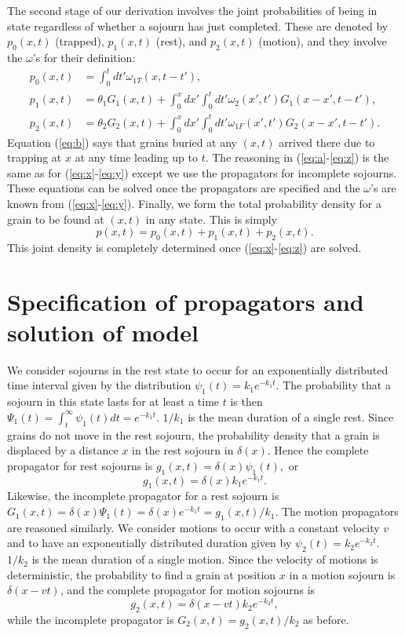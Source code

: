 \documentclass[]{agujournal2018}
\newcommand\be{\begin{equation}}
\newcommand\ee{\end{equation}}
\begin{document}
The second stage of our derivation involves the joint probabilities of being in state regardless of whether a sojourn has just completed. These are denoted by  $p_0(x,t)$ (trapped), $p_1(x,t)$ (rest), and $p_2(x,t)$ (motion), and they involve the $\omega$'s for their definition:
\begin{align}
p_0(x,t) &= \int_0^t dt' \omega_{1T}(x,t-t'), \label{eq:b}\\
p_1(x,t) &= \theta_1 G_1(x,t) + \int_0^x dx' \int_0^t dt' \omega_2(x',t')G_1(x-x',t-t'),\label{eq:a}\\
p_2(x,t) &= \theta_2 G_2(x,t) + \int_0^x dx' \int_0^t dt'  \omega_{1F}(x',t')G_2(x-x',t-t').\label{eq:z}
\end{align}
Equation (\ref{eq:b}) says that grains buried at any $(x,t)$ arrived there due to trapping at $x$ at any time leading up to $t$.
The reasoning in (\ref{eq:a}-\ref{eq:z}) is the same as for (\ref{eq:x}-\ref{eq:y}) except we use the propagators for incomplete sojourns.
These equations can be solved once the propagators are specified and the $\omega$'s are known from (\ref{eq:x}-\ref{eq:y}).
Finally, we form the total probability density for a grain to be found at $(x,t)$ in any state.
This is simply 
\be p(x,t) = p_0(x,t) + p_1(x,t) + p_2(x,t). \label{eq:dist}\ee
This joint density is completely determined once (\ref{eq:x}-\ref{eq:z}) are solved.


\section{Specification of propagators and solution of model}
\label{sec:solution}
We consider sojourns in the rest state to occur for an exponentially distributed time interval given by the distribution $\psi_1(t) = k_1 e^{-k_1t}.$
The probability that a sojourn in this state lasts for at least a time $t$ is then $\Psi_1(t) = \int_t^\infty \psi_1(t)dt = e^{-k_1 t}$.
$1/k_1$ is the mean duration of a single rest.
Since grains do not move in the rest sojourn, the probability density that a grain is displaced by a distance $x$ in the rest sojourn in $\delta(x)$.
Hence the complete propagator for rest sojourns is $g_1(x,t) = \delta(x)\psi_1(t),$ or 
\be g_1(x,t) = \delta(x)k_1e^{-k_1t}.\label{eq:prop1} \ee
Likewise, the incomplete propagator for a rest sojourn is $G_1(x,t) = \delta(x)\Psi_1(t) = \delta(x)e^{-k_1t} = g_1(x,t)/k_1.$
The motion propagators are reasoned similarly.
We consider motions to occur with a constant velocity $v$ and to have an exponentially distributed duration given by $\psi_2(t) = k_2 e^{-k_2t}.$
$1/k_2$ is the mean duration of a single motion.
Since the velocity of motions is deterministic, the probability to find a grain at position $x$ in a motion sojourn is $\delta(x-vt)$, and the complete propagator for motion sojourns is 
\be g_2(x,t) = \delta(x-vt)k_2e^{-k_2t},\label{eq:prop2}\ee
while the incomplete propagator is $G_2(x,t) = g_2(x,t)/k_2$ as before.
\end{document}
